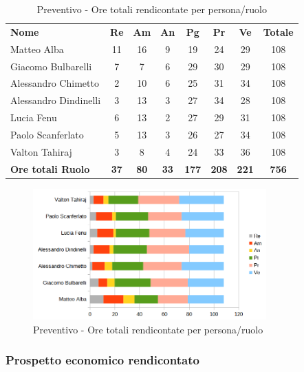 		\begin{table} [h!]
			\begin{center}
				\begin{tabular} { m{3.5cm} c c c c c c c }
					\rowcolor{lightgray}
					\textbf{Nome} & \textbf{Re} & \textbf{Am} & \textbf{An} & \textbf{Pg} & \textbf{Pr} & \textbf{Ve} & \textbf{Totale} \\
					Matteo Alba & 11 & 16 & 9 & 19 & 24 & 29 & 108 \\
					Giacomo Bulbarelli &7 & 7 & 6 & 29 & 30 & 29 & 108 \\
					Alessandro Chimetto &2 & 10 & 6 & 25 & 31 & 34 & 108 \\
					Alessandro Dindinelli & 3& 13 & 3 & 27 & 34 & 28 & 108 \\
					Lucia Fenu & 6 & 13 & 2 & 27 & 29 & 31 & 108\\
					Paolo Scanferlato & 5 & 13 & 3 & 26 & 27 & 34 & 108 \\
					Valton Tahiraj & 3 & 8 & 4 & 24 & 33 & 36 & 108 \\
					\textbf{Ore totali Ruolo} & \textbf{37} & \textbf{80} & \textbf{33} & \textbf{177} & \textbf{208}& \textbf{221} & \textbf{756}
				\end{tabular}
				\caption{Preventivo - Ore totali rendicontate per persona/ruolo}
			\end{center}
		\end{table}
	
		\begin{figure} [h!]
			\centering
			\includegraphics[width=0.8\textwidth]{res/img/grafici/preventivo-barre-finale-rendicontato.png}
			\caption{Preventivo - Ore totali rendicontate per persona/ruolo} 
		\end{figure}
	
	\newpage
	
	\subsubsection{Prospetto economico rendicontato}
	

